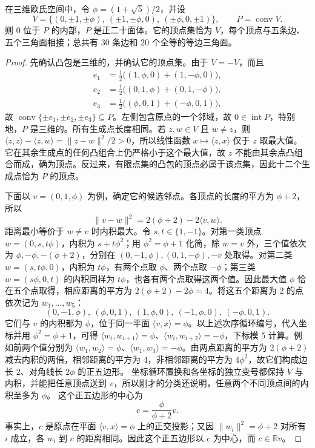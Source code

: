 \begin{lemma}[正二十面体的坐标模型]\label{b1:lem:icosahedron-model}
	在三维欧氏空间中，令 \(\phi=(1+\sqrt5)/2\)，并设
	\[
		V=\bigl\{(0,\pm1,\pm\phi),\ (\pm1,\pm\phi,0),\
		(\pm\phi,0,\pm1)\bigr\},\qquad P=\operatorname{conv}V.
	\]
	则 \(0\) 位于 \(P\) 的内部，\(P\) 是正二十面体。它的顶点集恰为 \(V\)，每个顶点与五条边、五个三角面相接；总共有 \(30\) 条边和 \(20\) 个全等的等边三角面。
\end{lemma}
\begin{proof}
	先确认凸包是三维的，并确认它的顶点集。由于 \(V=-V\)，而且
	\[
		\begin{aligned}
			e_1&=\tfrac12\bigl((1,\phi,0)+(1,-\phi,0)\bigr),\\
			e_2&=\tfrac12\bigl((0,1,\phi)+(0,1,-\phi)\bigr),\\
			e_3&=\tfrac12\bigl((\phi,0,1)+(-\phi,0,1)\bigr),
		\end{aligned}
	\]
	故 \(\operatorname{conv}\{\pm e_1,\pm e_2,\pm e_3\}\subseteq P\)。左侧包含原点的一个邻域，故 \(0\in\operatorname{int}P\)，特别地，\(P\) 是三维的。所有生成点长度相同。若 \(z,w\in V\) 且 \(w\ne z\)，则 \(\langle z,z\rangle-\langle z,w\rangle=\lVert z-w\rVert^2/2>0\)，所以线性函数 \(x\mapsto\langle z,x\rangle\) 仅于 \(z\) 取最大值。它在其余生成点的任何凸组合上仍严格小于这个最大值，故 \(z\) 不能由其余点凸组合而成，确为顶点。反过来，有限点集的凸包的顶点必属于该点集，因此十二个生成点恰为 \(P\) 的顶点。

	下面以 \(v=(0,1,\phi)\) 为例，确定它的候选邻点。各顶点的长度的平方为 \(\phi+2\)，所以
	\[
		\lVert v-w\rVert^2=2(\phi+2)-2\langle v,w\rangle.
	\]
	距离最小等价于 \(w\ne v\) 时内积最大。令 \(s,t\in\{1,-1\}\)。对第一类顶点 \(w=(0,s,t\phi)\)，内积为 \(s+t\phi^2\)；用 \(\phi^2=\phi+1\) 化简，除 \(w=v\) 外，三个值依次为 \(\phi,-\phi,-(\phi+2)\)，分别在 \((0,-1,\phi),(0,1,-\phi),-v\) 处取得。对第二类 \(w=(s,t\phi,0)\)，内积为 \(t\phi\)，有两个点取 \(\phi\)、两个点取 \(-\phi\)；第三类 \(w=(s\phi,0,t)\) 的内积同样为 \(t\phi\)，也各有两个点取得这两个值。因此最大值 \(\phi\) 恰在五个点取得，相应距离的平方为 \(2(\phi+2)-2\phi=4\)。将这五个距离为 \(2\) 的点依次记为 \(w_1,\ldots,w_5\)：
	\[
		(0,-1,\phi),\ (\phi,0,1),\ (1,\phi,0),\
		(-1,\phi,0),\ (-\phi,0,1).
	\]
	它们与 \(v\) 的内积都为 \(\phi\)，位于同一平面 \(\langle v,x\rangle=\phi\)。以上述次序循环编号，代入坐标并用 \(\phi^2=\phi+1\)，可得 \(\langle w_i,w_{i+1}\rangle=\phi\)、\(\langle w_i,w_{i+2}\rangle=-\phi\)，下标模 \(5\) 计算。例如前两个值分别为 \(\langle w_1,w_2\rangle=\phi\)、\(\langle w_1,w_3\rangle=-\phi\)。由两点距离的平方为 \(2(\phi+2)\) 减去内积的两倍，相邻距离的平方为 \(4\)，非相邻距离的平方为 \(4\phi^2\)，故它们构成边长 \(2\)、对角线长 \(2\phi\) 的正五边形。 坐标循环置换和各坐标的独立变号都保持 \(V\) 与内积，并能把任意顶点送到 \(v\)，所以刚才的分类还说明，任意两个不同顶点间的内积至多为 \(\phi\)。 这个正五边形的中心为
	\begin{equation}\label{b1:eq:icosahedron-neighbor-center}
		c=\frac{\phi}{\phi+2}v.
	\end{equation}
	事实上，\(c\) 是原点在平面 \(\langle v,x\rangle=\phi\) 上的正交投影；又因 \(\lVert w_i\rVert^2=\phi+2\) 对所有 \(i\) 成立，各 \(w_i\) 到 \(c\) 的距离相同。因此这个正五边形以 \(c\) 为中心，而 \(c\in\mathbb Rv\)。


\end{proof}
